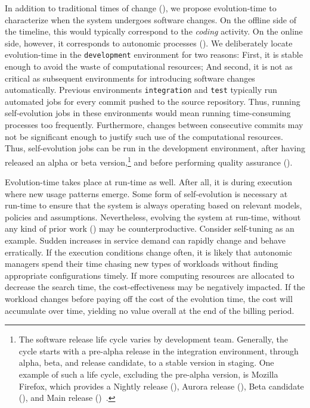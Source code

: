 In addition to traditional times of change (), we propose evolution-time to characterize when the system undergoes software changes. On the offline side of the timeline, this would typically correspond to the \emph{coding} activity. On the online side, however, it corresponds to autonomic processes (). We deliberately locate evolution-time in the \texttt{development} environment for two reasons: First, it is stable enough to avoid the waste of computational resources; And second, it is not as critical as subsequent environments for introducing software changes automatically. Previous environments \texttt{integration} and \texttt{test} typically run automated jobs for every commit pushed to the source repository. Thus, running self-evolution jobs in these environments would mean running time-consuming processes too frequently. Furthermore, changes between consecutive commits may not be significant enough to justify such use of the computational resources. Thus, self-evolution jobs can be run in the development environment, after having released an alpha or beta version,\footnote{The software release life cycle varies by development team. Generally, the cycle starts with a pre-alpha release in the integration environment, through alpha, beta, and release candidate, to a stable version in staging. One example of such a life cycle, excluding the pre-alpha version, is Mozilla Firefox, which provides a Nightly release (), Aurora release (), Beta candidate (), and Main release ()~\cite{khomh-2012-faster}.} and before performing quality assurance ().

Evolution-time takes place at run-time as well. After all, it is during execution where new usage patterns emerge. Some form of self-evolution is necessary at run-time to ensure that the system is always operating based on relevant models, policies and assumptions. Nevertheless, evolving the system at run-time, without any kind of prior work () may be counterproductive. Consider self-tuning as an example. Sudden increases in service demand can rapidly change and behave erratically. If the execution conditions change often, it is likely that autonomic managers spend their time chasing new types of workloads without finding appropriate configurations timely. If more computing resources are allocated to decrease the search time, the cost-effectiveness may be negatively impacted. If the workload changes before paying off the cost of the evolution time, the cost will accumulate over time, yielding no value overall at the end of the billing period.

